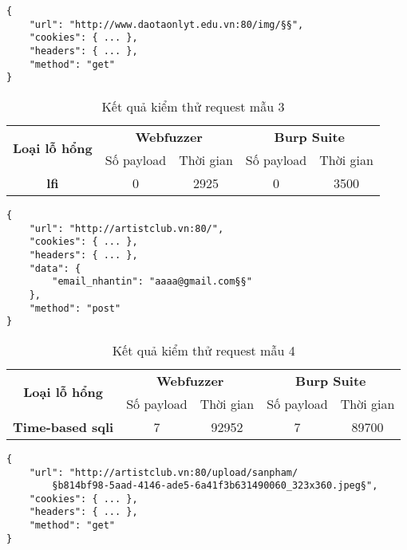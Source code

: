 \FloatBarrier
\begin{lstlisting}[style=ES6, label={lst:base-request-3}, caption={Request mẫu 3}]
{
    "url": "http://www.daotaonlyt.edu.vn:80/img/§§",
    "cookies": { ... },
    "headers": { ... },
    "method": "get"
}
\end{lstlisting}
\FloatBarrier
\begin{table}[ht]
    \centering
    \caption{Kết quả kiểm thử request mẫu 3}
    \label{tab:testing-result-3}
    \begin{tabular}[ht]{ccccc}
        \toprule[1pt]\midrule[0.3pt]
            \multirow{2}{*}{\textbf{Loại lỗ hổng}}&\multicolumn{2}{c}{\textbf{Webfuzzer}}&\multicolumn{2}{c}{\textbf{Burp Suite}}\\
            \cmidrule(lr){2-3}\cmidrule(lr){4-5}{}&Số payload&Thời gian&Số payload&Thời gian\\
        \midrule[0.3pt]
            \textbf{\acrshort{lfi}}&0&2925&0&3500\\
        \midrule[0.3pt]\bottomrule[1pt]
    \end{tabular}
\end{table}
\FloatBarrier
\begin{lstlisting}[style=ES6, label={lst:base-request-4}, caption={Request mẫu 4 có lỗ hổng time-based \acrshort{sqli}}]
{
    "url": "http://artistclub.vn:80/",
    "cookies": { ... },
    "headers": { ... },
    "data": {
        "email_nhantin": "aaaa@gmail.com§§"
    },
    "method": "post"
}
\end{lstlisting}
\FloatBarrier
\begin{table}[ht]
    \centering
    \caption{Kết quả kiểm thử request mẫu 4}
    \label{tab:testing-result-4}
    \begin{tabular}[ht]{ccccc}
        \toprule[1pt]\midrule[0.3pt]
            \multirow{2}{*}{\textbf{Loại lỗ hổng}}&\multicolumn{2}{c}{\textbf{Webfuzzer}}&\multicolumn{2}{c}{\textbf{Burp Suite}}\\
            \cmidrule(lr){2-3}\cmidrule(lr){4-5}{}&Số payload&Thời gian&Số payload&Thời gian\\
        \midrule[0.3pt]
            \textbf{Time-based \acrshort{sqli}}&7&92952&7&89700\\
        \midrule[0.3pt]\bottomrule[1pt]
    \end{tabular}
\end{table}
\FloatBarrier
\begin{lstlisting}[style=ES6, label={lst:base-request-5}, caption={Request mẫu 5}]
{
    "url": "http://artistclub.vn:80/upload/sanpham/
        §b814bf98-5aad-4146-ade5-6a41f3b631490060_323x360.jpeg§",
    "cookies": { ... },
    "headers": { ... },
    "method": "get"
}
\end{lstlisting}
